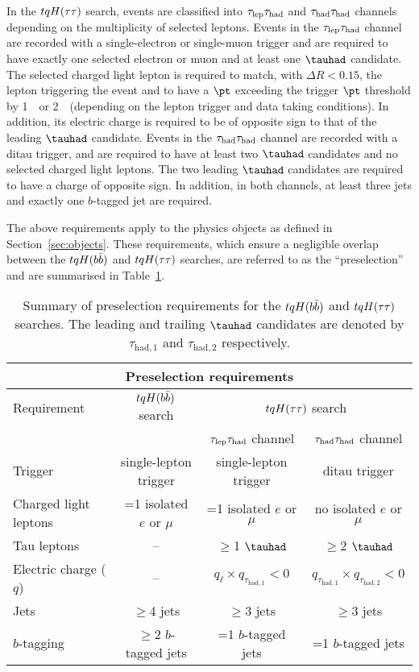 In the $tqH(\tau\tau)$ search, events are classified into $\tau_{\mathrm{lep}} \tau_{\mathrm{had}}$ and $\tau_{\mathrm{had}} \tau_{\mathrm{had}}$ channels depending on the 
multiplicity of selected leptons. Events in the $\tau_{\mathrm{lep}} \tau_{\mathrm{had}}$ channel are recorded with a single-electron or single-muon trigger 
and are required to have exactly one selected electron or muon and at least one $\tauhad$ candidate. 
The selected charged light lepton is required to match, with $\Delta R < 0.15$, the lepton triggering the event and to have a $\pt$ exceeding the trigger $\pt$ threshold by 1~\gev\ or 2~\gev\ (depending on the lepton trigger and 
data taking conditions). In addition, its electric charge is required to be of opposite sign to that of the leading $\tauhad$ candidate.
Events in the $\tau_{\mathrm{had}} \tau_{\mathrm{had}}$ channel are recorded with a ditau trigger, and are required to have at least two $\tauhad$ candidates and 
no selected charged light leptons. The two leading $\tauhad$ candidates are required to have a charge of opposite sign. 
In addition, in both channels, at least three jets and exactly one $b$-tagged jet are required.

The above requirements apply to the physics objects as defined in Section~\ref{sec:objects}.
These requirements, which ensure a negligible overlap between the $tqH(b\bar{b})$ and $tqH(\tau\tau)$ searches,
are referred to as the ``preselection'' and are summarised in Table~\ref{tab:preselection}. 

\begin{table*}[t!]
\begin{center}
\begin{tabular}{l|c|cc}
\toprule\toprule
\multicolumn{4}{c}{Preselection requirements} \\      
\midrule
Requirement &  $tqH(b\bar{b})$ search & \multicolumn{2}{c}{$tqH(\tau\tau)$ search} \\      
& & $\tau_{\mathrm{lep}} \tau_{\mathrm{had}}$ channel & $\tau_{\mathrm{had}} \tau_{\mathrm{had}}$ channel \\
\midrule
Trigger & single-lepton trigger & single-lepton trigger & ditau trigger  \\
Charged light leptons  & =1 isolated $e$ or $\mu$ & =1 isolated $e$ or $\mu$ & no isolated $e$ or $\mu$ \\
Tau leptons & -- & $\geq$1 $\tauhad$ & $\geq$2 $\tauhad$ \\
Electric charge ($q$) & -- & $q_\ell \times q_{\tau_{\mathrm{had,1}}} < 0$ & $q_{\tau_{\mathrm{had,1}}} \times q_{\tau_{\mathrm{had,2}}} < 0$ \\
Jets  &  $\geq$4 jets & $\geq$3 jets & $\geq$3 jets \\
$b$-tagging & $\geq$2 $b$-tagged jets & =1 $b$-tagged jets & =1 $b$-tagged jets  \\
\bottomrule\bottomrule
\end{tabular}
\caption{\small{Summary of preselection requirements for the $tqH(b\bar{b})$ and $tqH(\tau\tau)$ searches. 
The leading and trailing $\tauhad$ candidates are denoted by $\tau_{\mathrm{had,1}}$ and $\tau_{\mathrm{had,2}}$ respectively.}}
\label{tab:preselection}
\end{center}
\end{table*}

